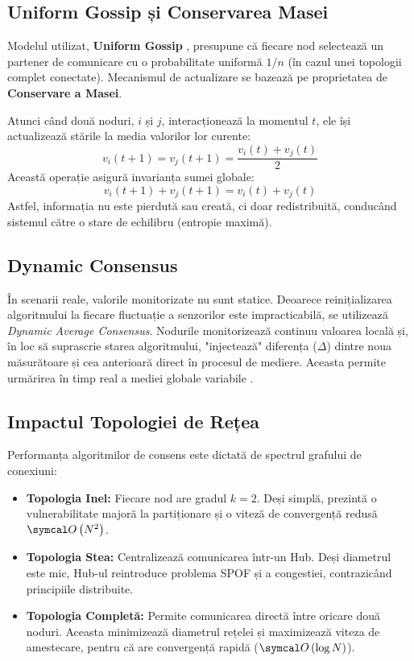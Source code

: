 \subsection{Uniform Gossip și Conservarea Masei}
Modelul utilizat, \textbf{Uniform Gossip} \cite{kempe2003gossip}, presupune că fiecare nod selectează un partener de comunicare cu o probabilitate uniformă $1/n$ (în cazul unei topologii complet conectate). Mecanismul de actualizare se bazează pe proprietatea de \textbf{Conservare a Masei}.

Atunci când două noduri, $i$ și $j$, interacționează la momentul $t$, ele își actualizează stările la media valorilor lor curente:
\[ v_i(t+1) = v_j(t+1) = \frac{v_i(t) + v_j(t)}{2} \]
Această operație asigură invarianța sumei globale:
\[ v_i(t+1) + v_j(t+1) = v_i(t) + v_j(t) \]
Astfel, informația nu este pierdută sau creată, ci doar redistribuită, conducând sistemul către o stare de echilibru (entropie maximă).

\subsection{Dynamic Consensus}
În scenarii reale, valorile monitorizate nu sunt statice. Deoarece reinițializarea algoritmului la fiecare fluctuație a senzorilor este impracticabilă, se utilizează \textit{Dynamic Average Consensus}. Nodurile monitorizează continuu valoarea locală și, în loc să suprascrie starea algoritmului, "injectează" diferența ($\Delta$) dintre noua măsurătoare și cea anterioară direct în procesul de mediere. Aceasta permite urmărirea în timp real a mediei globale variabile \cite{spanos2005dynamic}.

\subsection{Impactul Topologiei de Rețea}
Performanța algoritmilor de consens este dictată de spectrul grafului de conexiuni:
\begin{itemize} 
    \item \textbf{Topologia Inel:} Fiecare nod are gradul $k=2$. Deși simplă, prezintă o vulnerabilitate majoră la partiționare și o viteză de convergență redusă $\bigO{N^2}$.
    \item \textbf{Topologia Stea:} Centralizează comunicarea într-un Hub. Deși diametrul este mic, Hub-ul reintroduce problema SPOF și a congestiei, contrazicând principiile distribuite.
    \item \textbf{Topologia Completă:} Permite comunicarea directă între oricare două noduri. Aceasta minimizează diametrul rețelei și maximizează viteza de amestecare, pentru că are convergență rapidă ($\bigO{\log N}$).
\end{itemize}